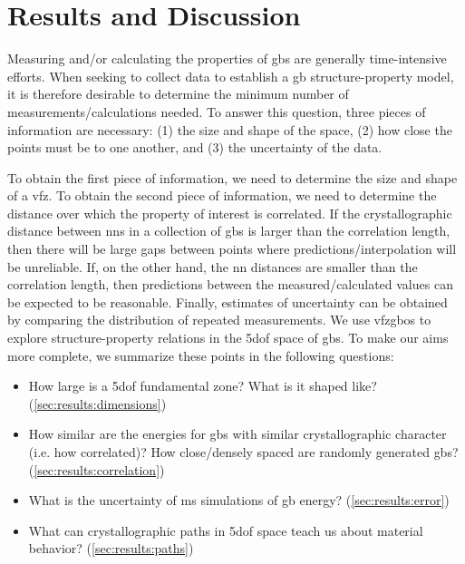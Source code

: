 \documentclass[final,twocolumn,12pt]{elsarticle}
\begin{document}
	\section{Results and Discussion} \label{sec:results}

    Measuring and/or calculating the properties of \glspl{gb} are generally time-intensive efforts. When seeking to collect data to establish a \gls{gb} structure-property model, it is therefore desirable to determine the minimum number of measurements/calculations needed. To answer this question, three pieces of information are necessary: (1) the size and shape of the space, (2) how close the points must be to one another, and (3) the uncertainty of the data.
    
    To obtain the first piece of information, we need to determine the size and shape of a \gls{vfz}. To obtain the second piece of information, we need to determine the distance over which the property of interest is correlated. If the crystallographic distance between \glspl{nn} in a collection of \glspl{gb} is larger than the correlation length, then there will be large gaps between points where predictions/interpolation will be unreliable. If, on the other hand, the \gls{nn} distances are smaller than the correlation length, then predictions between the measured/calculated values can be expected to be reasonable. Finally, estimates of uncertainty can be obtained by comparing the distribution of repeated measurements. We use \glspl{vfzgbo} to explore structure-property relations in the \gls{5dof} space of \glspl{gb}. To make our aims more complete, we summarize these points in the following questions:
	\begin{itemize}
		\item How large is a \gls{5dof} fundamental zone? What is it shaped like? (\cref{sec:results:dimensions})
		\item How similar are the energies for \glspl{gb} with similar crystallographic character (i.e. how correlated)? How close/densely spaced are randomly generated \glspl{gb}? (\cref{sec:results:correlation})
		\item What is the uncertainty of \gls{ms} simulations of \gls{gb} energy? (\cref{sec:results:error}) %
		\item What can crystallographic paths in \gls{5dof} space teach us about material behavior? (\cref{sec:results:paths})
	\end{itemize}
	
\end{document}
